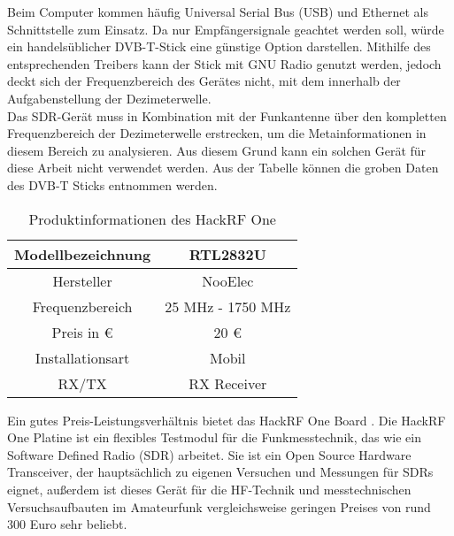 Beim Computer kommen häufig Universal Serial Bus (USB) und Ethernet als Schnittstelle zum  Einsatz.
Da nur Empfängersignale geachtet werden soll, würde ein handelsüblicher DVB-T-Stick eine günstige Option darstellen. Mithilfe des entsprechenden Treibers kann der Stick mit GNU Radio genutzt werden, jedoch deckt sich der Frequenzbereich des Gerätes nicht, mit dem innerhalb der Aufgabenstellung der Dezimeterwelle.\\
Das SDR-Gerät muss in Kombination mit der Funkantenne über den kompletten Frequenzbereich der Dezimeterwelle erstrecken, um die Metainformationen in diesem Bereich zu analysieren. Aus diesem Grund kann ein solchen Gerät für diese Arbeit nicht verwendet werden. Aus der Tabelle können die groben Daten des DVB-T Sticks entnommen werden.\\
\begin{table}[h]
	\centering
	\begin{tabular}{c|c}
		Modellbezeichnung & RTL2832U\\
		\hline
		Hersteller & NooElec\\ 
		\hline 
		Frequenzbereich & 25 MHz - 1750 MHz \\ 
		\hline 
		Preis in \euro & 20 \euro \\ 
		\hline 
		Installationsart & Mobil \\ 
		\hline 
		RX/TX & RX Receiver \\ 
	\end{tabular} 
	\caption{Produktinformationen des HackRF One}
\end{table}

Ein gutes Preis-Leistungsverhältnis bietet das HackRF One Board \cite{greatscott}. Die HackRF One Platine ist ein flexibles Testmodul für die Funkmesstechnik, das wie ein Software Defined Radio (SDR) arbeitet. Sie ist ein Open Source Hardware Transceiver, der hauptsächlich zu eigenen Versuchen und Messungen für SDRs eignet, außerdem ist dieses Gerät für die HF-Technik und messtechnischen Versuchsaufbauten im Amateurfunk vergleichsweise geringen Preises von rund 300 Euro sehr beliebt.\\

